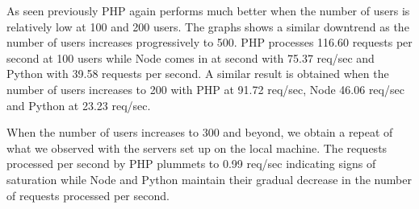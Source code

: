\documentclass[../thesis.tex]{subfiles}
\begin{document}
As seen previously PHP again performs much better when the number of users is relatively low at 100 and 200 users. The graphs shows a similar downtrend as the number of users increases progressively to 500. PHP processes 116.60 requests per second at 100 users while Node comes in at second with 75.37 req/sec and Python with 39.58 requests per second.
A similar result is obtained when the number of users increases to 200 with PHP at 91.72 req/sec, Node 46.06 req/sec and Python at 23.23 req/sec.
\newline

When the number of users increases to 300 and beyond, we obtain a repeat of what we observed with the servers set up on the local machine. The requests processed per second by PHP plummets to 0.99 req/sec indicating signs of saturation while Node and Python maintain their gradual decrease in the number of requests processed per second.
\newline
\end{document}

